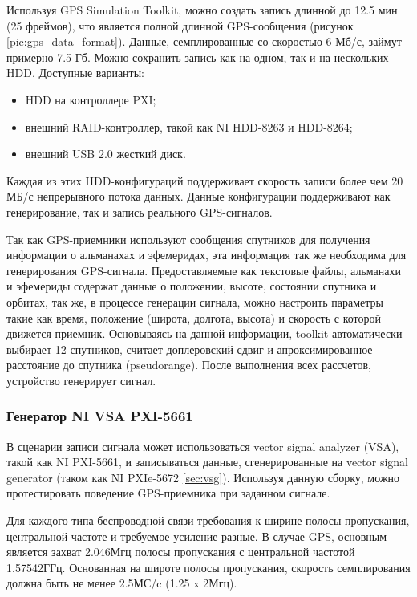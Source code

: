 Используя GPS Simulation Toolkit, можно создать запись длинной до 12.5 мин (25 фреймов), что является полной длинной
GPS-сообщения \cite{yacenkov, tsui} (рисунок \ref{pic:gps_data_format}). Данные, семплированные со скоростью 6 Мб/с,
займут примерно 7.5 Гб. Можно сохранить запись как на одном, так и на нескольких HDD. Доступные варианты:
\begin{itemize}
\item HDD на контроллере PXI;
\item внешний RAID-контроллер, такой как NI HDD-8263 и HDD-8264;
\item внешний USB 2.0 жесткий диск.
\end{itemize}

Каждая из этих HDD-конфигураций поддерживает скорость записи более чем 20 МБ/с непрерывного потока данных.
Данные конфигурации поддерживают как генерирование, так и запись реального GPS-сигналов.

Так как GPS-приемники используют сообщения спутников для получения информации о альманахах и эфемеридах, эта информация
так же необходима для генерирования GPS-сигнала. Предоставляемые как текстовые файлы, альманахи и эфемериды содержат
данные о положении, высоте, состоянии спутника и орбитах, так же, в процессе генерации сигнала, можно настроить параметры
такие как время, положение (широта, долгота, высота) и скорость с которой движется приемник. Основываясь на данной
информации, toolkit автоматически выбирает 12 спутников, считает доплеровский сдвиг и апроксимированное расстояние до
спутника (pseudorange). После выполнения всех рассчетов, устройство генерирует сигнал.

\subsubsection{Генератор NI VSA PXI-5661}
В сценарии записи сигнала может использоваться vector signal analyzer (VSA), такой как NI PXI-5661, и записываться данные,
сгенерированные на vector signal generator (таком как NI PXIe-5672 \ref{sec:vsg}). Используя данную сборку, можно
протестировать поведение GPS-приемника при заданном сигнале.

Для каждого типа беспроводной связи требования к ширине полосы пропускания, центральной частоте и требуемое усиление разные.
В случае GPS, основным является захват 2.046Мгц полосы пропускания с центральной частотой 1.57542ГГц. Основанная на
широте полосы пропускания, скорость семплирования должна быть не менее 2.5МС/c (1.25 x 2Мгц). 

